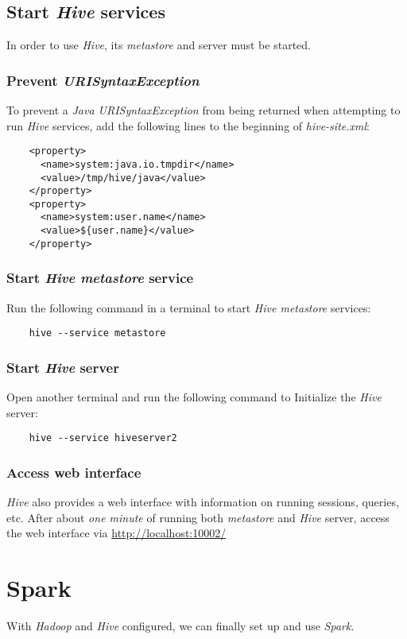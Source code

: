 \documentclass{article}
\begin{document}
  \subsection{Start \emph{Hive} services}
  \label{subsec:hiveservices}
  In order to use \emph{Hive}, its \emph{metastore} and server must be started.
    \subsubsection{Prevent \emph{URISyntaxException}}
    To prevent a \emph{Java URISyntaxException} from being returned when attempting to run
    \emph{Hive} services, add the following lines to the beginning of \emph{hive-site.xml}:
    \begin{verbatim}
    <property>
      <name>system:java.io.tmpdir</name>
      <value>/tmp/hive/java</value>
    </property>
    <property>
      <name>system:user.name</name>
      <value>${user.name}</value>
    </property>
    \end{verbatim}

    \subsubsection{Start \emph{Hive metastore} service}
    Run the following command in a terminal to start \emph{Hive metastore} services:
    \begin{verbatim}
    hive --service metastore
    \end{verbatim}

    \subsubsection{Start \emph{Hive} server}
    Open another terminal and run the following command to Initialize the \emph{Hive} server:
    \begin{verbatim}
    hive --service hiveserver2
    \end{verbatim}

    \subsubsection{Access web interface}
    \emph{Hive} also provides a web interface with information on running sessions, queries, etc.
    After about \emph{one minute} of running both \emph{metastore} and \emph{Hive} server, access
    the web interface via \url{http://localhost:10002/}

\newpage
\section{Spark}
With \emph{Hadoop} and \emph{Hive} configured, we can finally set up and use \emph{Spark}.
\end{document}
